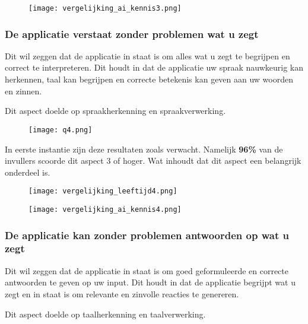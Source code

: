 \begin{figure}[htbp]
    \centering
    \texttt{[image: vergelijking\_ai\_kennis3.png]}
    \label{fig:vergelijking_ai_kennis3}
\end{figure}

\subsubsection{De applicatie verstaat zonder problemen wat u zegt}

Dit wil zeggen dat de applicatie in staat is om alles wat u zegt te begrijpen en correct te interpreteren. Dit houdt in dat de applicatie uw spraak nauwkeurig kan herkennen, taal kan begrijpen en correcte betekenis kan geven aan uw woorden en zinnen.

Dit aspect doelde op spraakherkenning en spraakverwerking.

\begin{figure}[htbp]
    \centering
    \texttt{[image: q4.png]}
    \label{fig:vraag_4_resultaat}
\end{figure}

In eerste instantie zijn deze resultaten zoals verwacht. Namelijk \textbf{96\%} van de invullers scoorde dit aspect 3 of hoger. Wat inhoudt dat dit aspect een belangrijk onderdeel is.

\begin{figure}[htbp]
    \centering
    \texttt{[image: vergelijking\_leeftijd4.png]}
    \label{fig:vergelijking_leeftijd4}
\end{figure}

\begin{figure}[htbp]
    \centering
    \texttt{[image: vergelijking\_ai\_kennis4.png]}
    \label{fig:vergelijking_ai_kennis4}
\end{figure}

\subsubsection{De applicatie kan zonder problemen antwoorden op wat u zegt}

Dit wil zeggen  dat de applicatie in staat is om goed geformuleerde en correcte antwoorden te geven op uw input. Dit houdt in dat de applicatie begrijpt wat u zegt en in staat is om relevante en zinvolle reacties te genereren. 

Dit aspect doelde op taalherkenning en taalverwerking.


